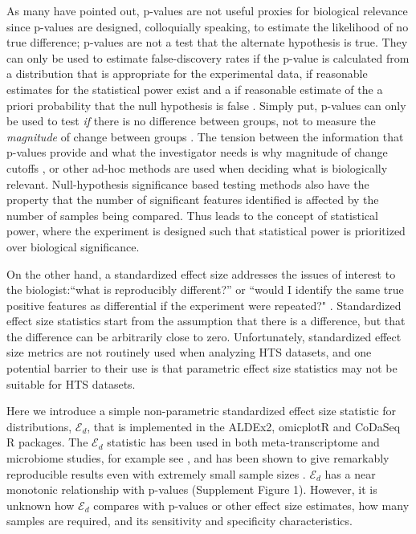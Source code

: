 As many have pointed out, p-values are not useful proxies for biological relevance since p-values are designed, colloquially speaking, to estimate the likelihood of no true difference; p-values are not a test that the alternate hypothesis is true. They can only be used to estimate false-discovery rates if the p-value is calculated from a distribution that is appropriate for the experimental data, if reasonable estimates for the statistical power exist and a if reasonable estimate of the a priori probability that the null hypothesis is false \citep{Colquhoun:2014aa, Halsey:2015aa}. Simply put, p-values can only be used to test \emph{if} there is no difference between groups, not to measure the \emph{magnitude} of change between groups \citep{coe2002s,Colquhoun:2014aa}. The tension between the information that p-values provide and what the investigator needs is why magnitude of change cutoffs \citep{Cui:2003aa}, or other ad-hoc methods are used when deciding what is biologically relevant. Null-hypothesis significance based testing methods  also have the property that the number of significant features identified  is affected by the number of samples being compared. Thus leads to the concept of statistical power, where the experiment is designed such that statistical power is prioritized over biological significance. 

On the other hand, a standardized effect size addresses the issues of interest to the biologist:``what is reproducibly different?'' or ``would I identify the same true positive features as differential if the experiment were repeated?"  \citep{coe2002s,shinichi:2004,Colquhoun:2014aa,gloor:effect}. Standardized effect size statistics start from the assumption that there is a difference, but that the difference can be arbitrarily close to zero. Unfortunately,  standardized effect size metrics are not routinely used when analyzing HTS datasets, and one potential barrier to their use is that parametric effect size statistics may not be suitable for  HTS datasets.  

Here we introduce a simple non-parametric standardized effect size statistic for distributions, $\mathcal{E}_{d}$, that is implemented in the ALDEx2, omicplotR  and CoDaSeq R packages.  The $\mathcal{E}_{d}$ statistic has been used in both meta-transcriptome and microbiome studies, for example see \citep{macklaim:2013, bian:2017}, and has been shown to give remarkably reproducible results even with extremely small sample sizes \citep{nelson:2015vaginal}.   $\mathcal{E}_{d}$  has a near monotonic relationship with p-values (Supplement Figure 1). However, it is unknown how  $\mathcal{E}_{d}$  compares with  p-values or other effect size estimates, how many samples are required, and its sensitivity and specificity characteristics. 

